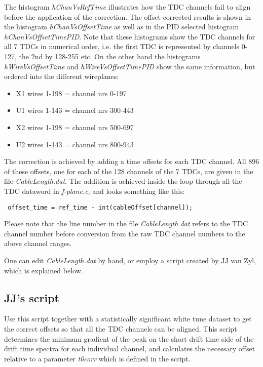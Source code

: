\documentclass[11pt]{report}
\begin{document}
The histogram {\it hChanVsRefTime} illustrates how the TDC channels fail to align before
the application of the correction.
The offset-corrected results is shown in the histogram {\it hChanVsOffsetTime}
as well as in the PID selected histogram {\it hChanVsOffsetTimePID}.
Note that these histograms show the TDC channels for all 7 TDCs in numerical order,
i.e. the first TDC is represented by channels 0-127, the 2nd by 128-255 etc.
On the other hand the histograms {\it hWireVsOffsetTime} and {\it hWireVsOffsetTimePID} 
show the same information, but ordered into the different wireplanes:
\begin{itemize}
\item X1 wires 1-198 = channel nrs 0-197
\item U1 wires 1-143 = channel nrs 300-443
\item X2 wires 1-198 = channel nrs 500-697
\item U2 wires 1-143 = channel nrs 800-943
\end{itemize}

The correction is achieved by adding a time offsets for each TDC channel.
All 896 of these offsets, one for each of the 128 channels of the 7 TDCs, are given in the
file {\it CableLength.dat}. The addition is achieved inside the
loop through all the TDC dataword in {\it f-plane.c}, and looks something like this:
\begin{verbatim} offset_time = ref_time - int(cableOffset[channel]);  \end{verbatim}
Please note that the line number in the file {\it CableLength.dat} refers to the TDC channel
number before conversion from the raw TDC channel numbers to the above channel ranges.

One can edit {\it CableLength.dat} by hand, or employ a script created by JJ van Zyl, which 
is explained below.

\subsection{JJ's script}

Use this script together with a statistically significant 
white tune dataset to get the correct offsets so that all the TDC channels can be aligned. 
This script determines the minimum gradient
of the peak on the short drift time side of the drift time spectra for each
individual channel, and calculates the
necessary offset relative to a parameter {\it t0corr} which is defined in the script.
\end{document}

